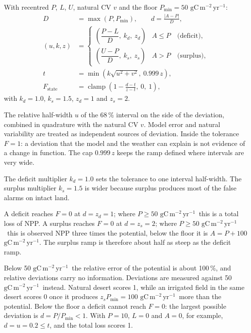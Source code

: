 \documentclass[11pt,a4paper]{article}
\newcommand{\npp}{\ensuremath{\mathrm{gC\,m^{-2}\,yr^{-1}}}}
\DeclareMathOperator{\clamp}{clamp}
\begin{document}
With recentred $P$, $L$, $U$, natural CV $v$ and the floor $P_{\min} = 50$ \npp:
\begin{align}
D &= \max(P, P_{\min}), \qquad d = \frac{|A - P|}{D}, \\[4pt]
(u, k, z) &= \begin{cases}
\left(\dfrac{P - L}{D},\ k_d,\ z_d\right) & A \le P \quad \text{(deficit)},\\[10pt]
\left(\dfrac{U - P}{D},\ k_s,\ z_s\right) & A > P \quad \text{(surplus)},
\end{cases} \\[4pt]
t &= \min\!\left(k\sqrt{u^2 + v^2},\ 0.999\,z\right), \\[4pt]
F_{\text{state}} &= \clamp\!\left(1 - \frac{d - t}{z - t},\ 0,\ 1\right),
\end{align}
with $k_d = 1.0$, $k_s = 1.5$, $z_d = 1$ and $z_s = 2$.

\begin{description}[leftmargin=1.2em]
\item[Tolerance $t$.] The relative half-width $u$ of the 68\,\% interval on the side of the
deviation, combined in quadrature with the natural CV $v$. Model error and natural
variability are treated as independent sources of deviation. Inside the tolerance $F = 1$: a
deviation that the model and the weather can explain is not evidence of a change in function.
The cap $0.999\,z$ keeps the ramp defined where intervals are very wide.
\item[Multipliers.] The deficit multiplier $k_d = 1.0$ sets the tolerance to one interval
half-width. The surplus multiplier $k_s = 1.5$ is wider because surplus produces most of the
false alarms on intact land.
\item[Zero points.] A deficit reaches $F = 0$ at $d = z_d = 1$; where $P \ge 50$ \npp\ this is a
total loss of NPP. A surplus reaches $F = 0$ at $d = z_s = 2$; where $P \ge 50$ \npp\ this is
observed NPP three times the potential, below the floor it is $A = P + 100$ \npp. The surplus ramp
is therefore about half as steep as the deficit ramp.
\item[Floor.] Below 50 \npp\ the relative error of the potential is about 100\,\%, and relative
deviations carry no information. Deviations are measured against 50 \npp\ instead. Natural
desert scores 1, while an irrigated field in the same desert scores 0 once it produces
$z_s P_{\min} = 100$ \npp\ more than the potential. Below the floor a deficit cannot reach
$F = 0$: the largest possible deviation is $d = P / P_{\min} < 1$. With $P = 10$, $L = 0$ and
$A = 0$, for example, $d = u = 0.2 \le t$, and the total loss scores 1.
\end{description}
\end{document}
